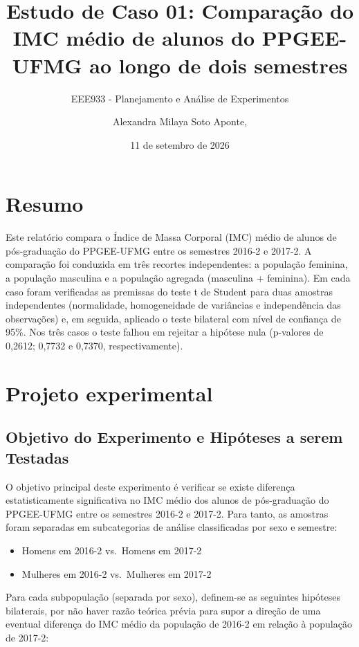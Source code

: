 \documentclass[
]{article}
\title{Estudo de Caso 01: Comparação do IMC médio de alunos do PPGEE-UFMG ao longo de dois semestres}
\subtitle{EEE933 - Planejamento e Análise de Experimentos}
\author{Alexandra Milaya Soto Aponte,}
\date{11 de setembro de 2026}
\providecommand{\tightlist}{%
  \setlength{\itemsep}{0pt}\setlength{\parskip}{0pt}}
\begin{document}
\maketitle

\section{Resumo}\label{resumo}

Este relatório compara o Índice de Massa Corporal (IMC) médio de alunos de pós-graduação
do PPGEE-UFMG entre os semestres 2016-2 e 2017-2. A comparação foi conduzida em três
recortes independentes: a população feminina, a população masculina e a população agregada
(masculina + feminina). Em cada caso foram verificadas as premissas do teste t de Student
para duas amostras independentes (normalidade, homogeneidade de variâncias e independência
das observações) e, em seguida, aplicado o teste bilateral com nível de confiança de 95\%.
Nos três casos o teste falhou em rejeitar a hipótese nula (p-valores de 0,2612; 0,7732 e
0,7370, respectivamente).

\section{Projeto experimental}\label{projeto-experimental}

\subsection{Objetivo do Experimento e Hipóteses a serem Testadas}\label{objetivo-do-experimento-e-hipuxf3teses-a-serem-testadas}

O objetivo principal deste experimento é verificar se existe diferença estatisticamente significativa no IMC médio dos alunos de pós-graduação do PPGEE-UFMG entre os semestres 2016-2 e 2017-2. Para tanto, as amostras foram separadas em subcategorias de análise classificadas por sexo e semestre:

\begin{itemize}
\tightlist
\item
  Homens em 2016-2 vs.~Homens em 2017-2
\item
  Mulheres em 2016-2 vs.~Mulheres em 2017-2
\end{itemize}

Para cada subpopulação (separada por sexo), definem-se as seguintes hipóteses bilaterais, por não haver razão teórica prévia para supor a direção de uma eventual diferença do IMC médio da população de 2016-2 em relação à população de 2017-2:
\end{document}

